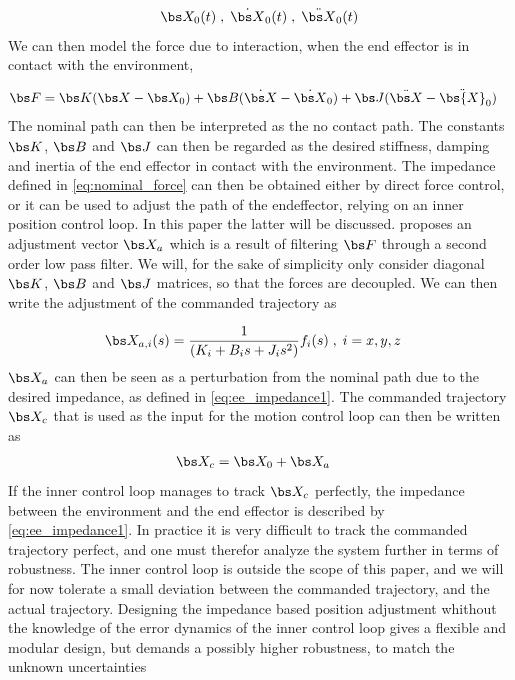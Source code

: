 \begin{align}
	\bs X_0(t) \; , \; \dot{\bs X}_0(t)\; , \; \ddot{\bs X}_0(t)	
	\label{eq:nominal_force}
\end{align}
We can then model the force due to interaction, when the end effector is in contact with the environment, \cite{impedance_stability}

\begin{align}
	\bs F&=\bs K(\bs X - \bs X_0) + \bs B(\dot{\bs X} - \dot{\bs X}_0) + \bs J(\ddot{\bs X} - \ddot{\bs{X}}_0)
	\label{eq:ee_impedance1}
\end{align}
The nominal path can then be interpreted as the no contact path. The constants $\bs K$, $\bs B$ and $\bs J$ can then be regarded as the desired stiffness, damping and inertia of the end effector in contact with the environment. The impedance defined in \eqref{eq:nominal_force} can then be obtained either by direct force control, or it can be used to adjust the path of the endeffector, relying on an inner position control loop. In this paper the latter will be discussed. \cite{impedance_stability} proposes an adjustment vector $\bs X_a$ which is a result of filtering $\bs F$ through a second order low pass filter. We will, for the sake of simplicity only consider diagonal $\bs K$, $\bs B$ and $\bs J$ matrices, so that the forces are decoupled. We can then write the adjustment of the commanded trajectory as

\begin{align}
	\bs X_{a,i}(s)&= \frac{1}{(K_i+ B_is+ J_is^2)} f_i(s) \; , \; i=x , y , z 
	\label{eq:x_adjusted}
\end{align}
$\bs X_a$ can then be seen as a perturbation from the nominal path due to the desired impedance, as defined in \eqref{eq:ee_impedance1}.  The commanded trajectory $\bs X_c$ that is used as the input for the motion control loop can then be written as
\begin{align}
	\bs X_c&= \bs X_0 + \bs X_a
	\label{eq:controlled_traj}
\end{align}
If the inner control loop manages to track $\bs X_c$ perfectly, the impedance between the environment and the end effector is described by \eqref{eq:ee_impedance1}. In practice it is very difficult to track the commanded trajectory perfect, and one must therefor analyze the system further in terms of robustness. The inner control loop is outside the scope of this paper, and we will for now tolerate a small deviation between the commanded trajectory, and the actual trajectory. Designing the impedance based position adjustment whithout the knowledge of the error dynamics of the inner control loop gives a flexible and modular design, but demands a possibly higher robustness, to match the unknown uncertainties 

